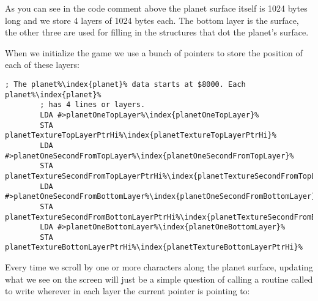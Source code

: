 As you can see in the code comment above the planet surface itself is 1024 bytes long and we store 4 layers of 1024
bytes each. The bottom layer is the surface, the other three are used for filling in the structures that dot the
planet's surface.

When we initialize the game we use a bunch of pointers to store the position of each of these layers:

\begin{lstlisting}[escapechar=\%]
        ; The planet%\index{planet}% data starts at $8000. Each planet%\index{planet}%
        ; has 4 lines or layers.
        LDA #>planetOneTopLayer%\index{planetOneTopLayer}%
        STA planetTextureTopLayerPtrHi%\index{planetTextureTopLayerPtrHi}%
        LDA #>planetOneSecondFromTopLayer%\index{planetOneSecondFromTopLayer}%
        STA planetTextureSecondFromTopLayerPtrHi%\index{planetTextureSecondFromTopLayerPtrHi}%
        LDA #>planetOneSecondFromBottomLayer%\index{planetOneSecondFromBottomLayer}%
        STA planetTextureSecondFromBottomLayerPtrHi%\index{planetTextureSecondFromBottomLayerPtrHi}%
        LDA #>planetOneBottomLayer%\index{planetOneBottomLayer}%
        STA planetTextureBottomLayerPtrHi%\index{planetTextureBottomLayerPtrHi}%
\end{lstlisting}

Every time we scroll by one or more characters along the planet surface, updating what we see on the screen will
just be a simple question of calling a routine called  to write wherever in each layer
the current pointer is pointing to:

